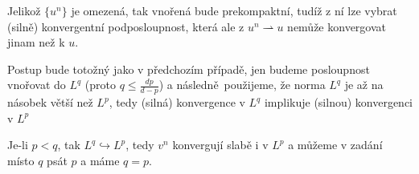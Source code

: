 \documentclass[12pt]{article}					%
\begin{document}
\begin{priklad}
\begin{dukazin}[$q ≤ p$]
			Jelikož $\{u^n\}$ je omezená, tak vnořená bude prekompaktní, tudíž z ní lze vybrat (silně) konvergentní podposloupnost, která ale z $u^n \rightharpoonup u$ nemůže konvergovat jinam než k $u$.
		\end{dukazin}

		\begin{dukazin}
			Postup bude totožný jako v předchozím případě, jen budeme posloupnost vnořovat do $L^q$ (proto $q ≤ \frac{dp}{d - p}$) a následně použijeme, že norma $L^q$ je až na násobek větší než $L^p$, tedy (silná) konvergence v $L^q$ implikuje (silnou) konvergenci v $L^p$
		\end{dukazin}

		\begin{dukazin}[$p < q$]
			Je-li $p < q$, tak $L^q \hookrightarrow L^p$, tedy $v^n$ konvergují slabě i v $L^p$ a můžeme v zadání místo $q$ psát $p$ a máme $q = p$.
		\end{dukazin}
	\end{priklad}
\end{document}
